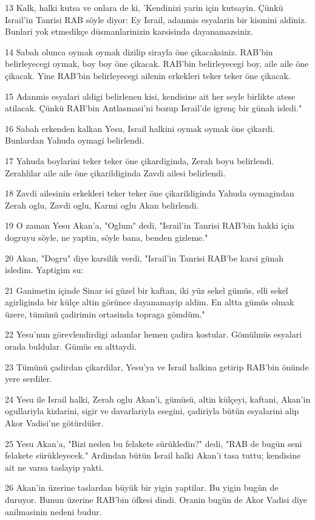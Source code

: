 \par 13 Kalk, halki kutsa ve onlara de ki, 'Kendinizi yarin için kutsayin. Çünkü Israil'in Tanrisi RAB söyle diyor: Ey Israil, adanmis esyalarin bir kismini aldiniz. Bunlari yok etmedikçe düsmanlarinizin karsisinda dayanamazsiniz.
\par 14 Sabah olunca oymak oymak dizilip sirayla öne çikacaksiniz. RAB'bin belirleyecegi oymak, boy boy öne çikacak. RAB'bin belirleyecegi boy, aile aile öne çikacak. Yine RAB'bin belirleyecegi ailenin erkekleri teker teker öne çikacak.
\par 15 Adanmis esyalari aldigi belirlenen kisi, kendisine ait her seyle birlikte atese atilacak. Çünkü RAB'bin Antlasmasi'ni bozup Israil'de igrenç bir günah isledi."
\par 16 Sabah erkenden kalkan Yesu, Israil halkini oymak oymak öne çikardi. Bunlardan Yahuda oymagi belirlendi.
\par 17 Yahuda boylarini teker teker öne çikardiginda, Zerah boyu belirlendi. Zerahlilar aile aile öne çikarildiginda Zavdi ailesi belirlendi.
\par 18 Zavdi ailesinin erkekleri teker teker öne çikarildiginda Yahuda oymagindan Zerah oglu, Zavdi oglu, Karmi oglu Akan belirlendi.
\par 19 O zaman Yesu Akan'a, "Oglum" dedi, "Israil'in Tanrisi RAB'bin hakki için dogruyu söyle, ne yaptin, söyle bana, benden gizleme."
\par 20 Akan, "Dogru" diye karsilik verdi, "Israil'in Tanrisi RAB'be karsi günah isledim. Yaptigim su:
\par 21 Ganimetin içinde Sinar isi güzel bir kaftan, iki yüz sekel gümüs, elli sekel agirliginda bir külçe altin görünce dayanamayip aldim. En altta gümüs olmak üzere, tümünü çadirimin ortasinda topraga gömdüm."
\par 22 Yesu'nun görevlendirdigi adamlar hemen çadira kostular. Gömülmüs esyalari orada buldular. Gümüs en alttaydi.
\par 23 Tümünü çadirdan çikardilar, Yesu'ya ve Israil halkina getirip RAB'bin önünde yere serdiler.
\par 24 Yesu ile Israil halki, Zerah oglu Akan'i, gümüsü, altin külçeyi, kaftani, Akan'in ogullariyla kizlarini, sigir ve davarlariyla esegini, çadiriyla bütün esyalarini alip Akor Vadisi'ne götürdüler.
\par 25 Yesu Akan'a, "Bizi neden bu felakete sürükledin?" dedi, "RAB de bugün seni felakete sürükleyecek." Ardindan bütün Israil halki Akan'i tasa tuttu; kendisine ait ne varsa taslayip yakti.
\par 26 Akan'in üzerine taslardan büyük bir yigin yaptilar. Bu yigin bugün de duruyor. Bunun üzerine RAB'bin öfkesi dindi. Oranin bugün de Akor Vadisi diye anilmasinin nedeni budur.

